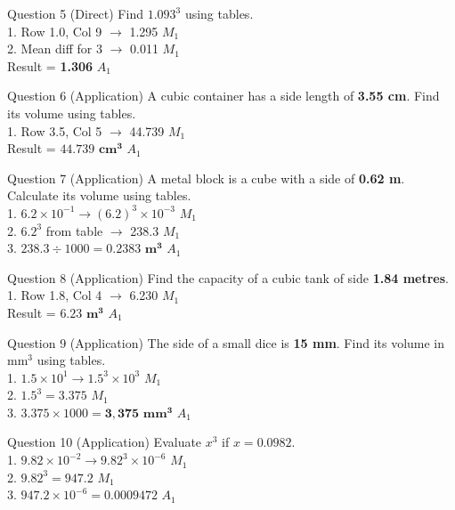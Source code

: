 \documentclass[12pt, a4paper, oneside]{article}
\begin{document}
\begin{solvingbox}{Question 5 (Direct)}
Find $1.093^3$ using tables. \\
1. Row 1.0, Col 9 $\rightarrow$ 1.295 \hfill $M_1$ \\
2. Mean diff for 3 $\rightarrow$ 0.011 \hfill $M_1$ \\
Result = \textbf{1.306} \hfill $A_1$
\end{solvingbox}

\begin{solvingbox}{Question 6 (Application)}
A cubic container has a side length of \textbf{3.55 cm}. Find its volume using tables. \\
1. Row 3.5, Col 5 $\rightarrow$ 44.739 \hfill $M_1$ \\
Result = $\mathbf{44.739\text{ cm}^3}$ \hfill $A_1$
\end{solvingbox}

\begin{solvingbox}{Question 7 (Application)}
A metal block is a cube with a side of \textbf{0.62 m}. Calculate its volume using tables. \\
1. $6.2 \times 10^{-1} \rightarrow (6.2)^3 \times 10^{-3}$ \hfill $M_1$ \\
2. $6.2^3$ from table $\rightarrow$ 238.3 \hfill $M_1$ \\
3. $238.3 \div 1000 = \mathbf{0.2383\text{ m}^3}$ \hfill $A_1$
\end{solvingbox}

\begin{solvingbox}{Question 8 (Application)}
Find the capacity of a cubic tank of side \textbf{1.84 metres}. \\
1. Row 1.8, Col 4 $\rightarrow$ 6.230 \hfill $M_1$ \\
Result = $\mathbf{6.23\text{ m}^3}$ \hfill $A_1$
\end{solvingbox}

\begin{solvingbox}{Question 9 (Application)}
The side of a small dice is \textbf{15 mm}. Find its volume in $\text{mm}^3$ using tables. \\
1. $1.5 \times 10^1 \rightarrow 1.5^3 \times 10^3$ \hfill $M_1$ \\
2. $1.5^3 = 3.375$ \hfill $M_1$ \\
3. $3.375 \times 1000 = \mathbf{3,375\text{ mm}^3}$ \hfill $A_1$
\end{solvingbox}

\begin{solvingbox}{Question 10 (Application)}
Evaluate $x^3$ if $x = 0.0982$. \\
1. $9.82 \times 10^{-2} \rightarrow 9.82^3 \times 10^{-6}$ \hfill $M_1$ \\
2. $9.82^3 = 947.2$ \hfill $M_1$ \\
3. $947.2 \times 10^{-6} = \mathbf{0.0009472}$ \hfill $A_1$
\end{solvingbox}
\end{document}
